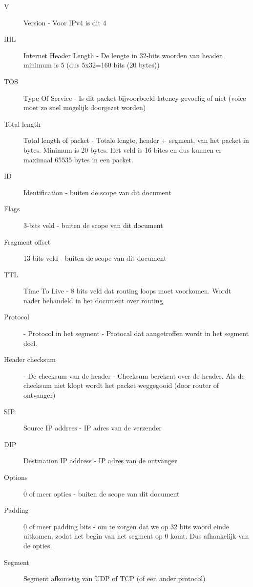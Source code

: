\begin{description}
	\item[V] Version - Voor IPv4 is dit 4
	\item[IHL] Internet Header Length - De lengte in 32-bits woorden van header, minimum is 5 (dus 5x32=160 bits (20 bytes))
	\item[TOS] Type Of Service - Is dit packet  bijvoorbeeld latency gevoelig of niet (voice moet zo snel mogelijk doorgezet worden)
	\item[Total length] Total length of packet - Totale lengte, header + segment, van het packet in bytes. Minimum is 20 bytes. Het veld is 16 bites en dus kunnen er maximaal 65535 bytes in een packet.
	\item[ID] Identification - buiten de scope van dit document
	\item[Flags] 3-bits veld - buiten de scope van dit document
	\item[Fragment offset] 13 bits veld - buiten de scope van dit document
	\item[TTL] Time To Live - 8 bits veld dat routing loops moet voorkomen. Wordt nader behandeld in het document over routing.
	\item[Protocol] - Protocol in het segment - Protocal dat aangetroffen wordt in het segment deel.
	\item[Header checksum] - De checksum van de header - Checksum berekent over de header. Als de checksum niet klopt wordt het packet weggegooid (door router of ontvanger)
	\item[SIP] Source IP address - IP adres van de verzender
	\item[DIP] Destination IP address - IP adres van de ontvanger
	\item[Options] 0 of meer opties - buiten de scope van dit document
	\item[Padding] 0 of meer padding bits - om te zorgen dat we op 32 bits woord einde uitkomen, zodat het begin van het segment op 0 komt. Dus afhankelijk van de opties.
	\item[Segment] Segment afkomstig van UDP of TCP (of een ander protocol)
\end{description}

